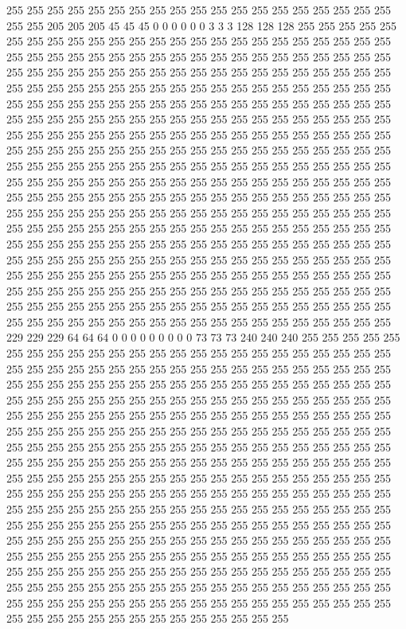 255 255 255 255 255 255 255 255 255 255 255 255 255 255 255 255 255 255 255 255 255 205 205 205 45 45 45 0 0 0 0 0 0 3 3 3 128 128 128 255 255 255 255 255 255 255 255 255 255 255 255 255 255 255 255 255 255 255 255 255 255 255 255 255 255 255 255 255 255 255 255 255 255 255 255 255 255 255 255 255 255 255 255 255 255 255 255 255 255 255 255 255 255 255 255 255 255 255 255 255 255 255 255 255 255 255 255 255 255 255 255 255 255 255 255 255 255 255 255 255 255 255 255 255 255 255 255 255 
255 255 255 255 255 255 255 255 255 255 255 255 255 255 255 255 255 255 255 255 255 255 255 255 255 255 255 255 255 255 255 255 255 255 255 255 255 255 255 255 255 255 255 255 255 255 255 255 255 255 255 255 255 255 255 255 255 255 255 255 255 255 255 255 255 255 255 255 255 255 255 255 255 255 255 255 255 255 255 255 255 255 255 255 255 255 255 255 255 255 255 255 255 255 255 255 255 255 255 255 255 255 255 255 255 255 255 255 255 255 255 255 255 255 255 255 255 255 255 255 255 255 255 255 255 255 255 255 
255 255 255 255 255 255 255 255 255 255 255 255 255 255 255 255 255 255 255 255 255 255 255 255 255 255 255 255 255 255 255 255 255 255 255 255 255 255 255 255 255 255 255 255 255 255 255 255 255 255 255 255 255 255 255 255 255 255 255 255 255 255 255 255 255 255 255 255 255 255 255 255 255 255 255 255 255 255 255 255 255 255 255 255 255 255 255 255 255 255 255 255 255 255 255 255 255 255 255 255 255 255 255 255 255 255 255 255 255 255 255 255 255 255 255 255 255 255 255 255 255 255 255 255 255 255 255 255 
255 255 255 255 255 255 255 255 255 255 255 255 255 255 255 255 255 255 255 255 255 229 229 229 64 64 64 0 0 0 0 0 0 0 0 0 73 73 73 240 240 240 255 255 255 255 255 255 255 255 255 255 255 255 255 255 255 255 255 255 255 255 255 255 255 255 255 255 255 255 255 255 255 255 255 255 255 255 255 255 255 255 255 255 255 255 255 255 255 255 255 255 255 255 255 255 255 255 255 255 255 255 255 255 255 255 255 255 255 255 255 255 255 255 255 255 255 255 255 255 255 255 255 255 255 255 255 255 
255 255 255 255 255 255 255 255 255 255 255 255 255 255 255 255 255 255 255 255 255 255 255 255 255 255 255 255 255 255 255 255 255 255 255 255 255 255 255 255 255 255 255 255 255 255 255 255 255 255 255 255 255 255 255 255 255 255 255 255 255 255 255 255 255 255 255 255 255 255 255 255 255 255 255 255 255 255 255 255 255 255 255 255 255 255 255 255 255 255 255 255 255 255 255 255 255 255 255 255 255 255 255 255 255 255 255 255 255 255 255 255 255 255 255 255 255 255 255 255 255 255 255 255 255 255 255 255 
255 255 255 255 255 255 255 255 255 255 255 255 255 255 255 255 255 255 255 255 255 255 255 255 255 255 255 255 255 255 255 255 255 255 255 255 255 255 255 255 255 255 255 255 255 255 255 255 255 255 255 255 255 255 255 255 255 255 255 255 255 255 255 255 255 255 255 255 255 255 255 255 255 255 255 255 255 255 255 255 255 255 255 255 255 255 255 255 255 255 255 255 255 255 255 255 255 255 255 255 255 255 255 255 255 255 255 255 255 255 255 255 255 255 255 255 255 255 255 255 255 255 255 255 255 255 255 255 
